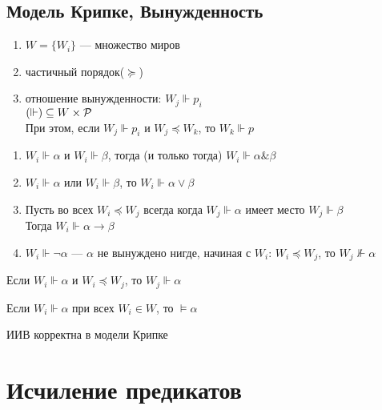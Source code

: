 \documentclass[english]{article}
\begin{document}
\subsection{Модель Крипке, Вынужденность}
\label{sec:org935e1af}
\begin{defintion}
	\-
	\begin{enumerate}
		\item \(W = \{W_i\}\) --- множество миров
		\item частичный порядок(\(\succeq\))
		\item отношение вынужденности: \(W_j \Vdash p_i\) \\
		      \((\Vdash)  \subseteq W \times \P\) \\
		      При этом, если \(W_j \Vdash p_i\) и \(W_j \preceq W_k\), то \(W_k \Vdash p\)
	\end{enumerate}
	\label{org70d4cdc}
\end{defintion}
\begin{definition}
	\-
	\begin{enumerate}
		\item \(W_i \Vdash \alpha\) и \(W_i \Vdash \beta\), тогда (и только тогда) \(W_i \Vdash \alpha \& \beta\) \\
		\item \(W_i \Vdash \alpha\) или \(W_i \Vdash \beta\), то \(W_i \Vdash \alpha \vee \beta\)
		\item Пусть во всех \(W_i \preceq W_j\) всегда когда \(W_j \Vdash \alpha\) имеет место \(W_j \Vdash \beta\) \\
		      Тогда \(W_i \Vdash \alpha \to \beta\)
		\item \(W_i \Vdash \neg \alpha\) --- \(\alpha\) не вынуждено нигде, начиная с \(W_i\):
		      \(W_i \preceq W_j\), то \(W_j \not\Vdash \alpha\)
	\end{enumerate}
	\label{org8f1edec}
\end{definition}
\begin{theorem}
	Если \(W_i \Vdash \alpha\) и \(W_i \preceq W_j\), то \(W_j \Vdash \alpha\)
	\label{org15974c2}
\end{theorem}
\begin{definition}
	Если \(W_i \Vdash \alpha\) при всех \(W_i \in W\), то \(\vDash \alpha\)
	\label{org2a4be2d}
\end{definition}
\begin{theorem}
	ИИВ корректна в модели Крипке
	\label{orgdaed82d}
\end{theorem}
\section{Исчиление предикатов}
\label{sec:org8ea33d6}
\end{document}
